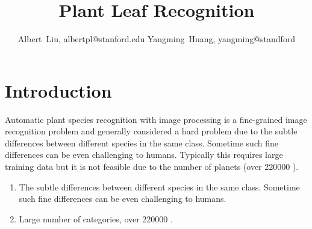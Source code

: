 \documentclass[journal, 10pt]{IEEEtran}
\begin{document}
%
\title{Plant Leaf Recognition}
%
%
%
\author{Albert~Liu, albertpl@stanford.edu
        Yangming~Huang, yangming@standford}%

%
%


\maketitle


\section{Introduction}
Automatic plant species recognition with image processing is a fine-grained image recognition problem and generally considered a hard problem due to the subtle differences between different species in the same class. Sometime such fine differences can be even challenging to humans. Typically this requires large training data but it is not feasible due to the number of planets (over 220000 \cite{Charles13}).
\begin{enumerate}
  \item The subtle differences between different species in the same class. Sometime such fine differences can be even challenging to humans.
  \item Large number of categories, over 220000 \cite{Charles13}.
\end{enumerate}
\end{document}
